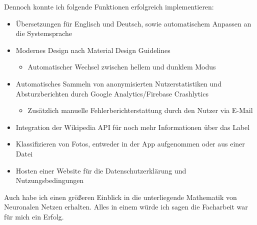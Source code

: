 Dennoch konnte ich folgende Funktionen erfolgreich implementieren:

\begin{itemize}
  \item Übersetzungen für Englisch und Deutsch, sowie automatischem Anpassen an die Systemsprache
  \item Modernes Design nach Material Design Guidelines
        \begin{itemize}
          \item Automatischer Wechsel zwischen hellem und dunklem Modus
        \end{itemize}
  \item Automatisches Sammeln von anonymisierten Nutzerstatistiken und Absturzberichten durch Google Analytics/Firebase Crashlytics
        \begin{itemize}
          \item Zusätzlich manuelle Fehlerberichterstattung durch den Nutzer via E-Mail
        \end{itemize}
  \item Integration der Wikipedia API für noch mehr Informationen über das Label
  \item Klassifizieren von Fotos, entweder in der App aufgenommen oder aus einer Datei
  \item Hosten einer Website für die Datenschutzerklärung und Nutzungsbedingungen
\end{itemize}

Auch habe ich einen größeren Einblick in die unterliegende Mathematik von Neuronalen Netzen erhalten. Alles in einem würde ich sagen die Facharbeit war für mich ein Erfolg.